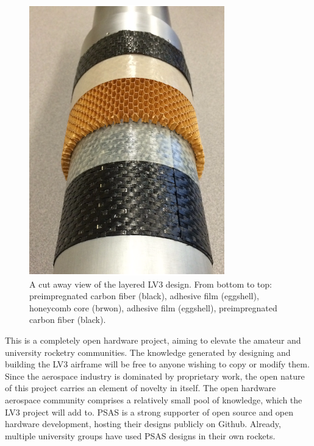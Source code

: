\documentclass{aiaa-tc}%
\begin{document}
\begin{figure}
\centering
\includegraphics[width=\linewidth]{img/layers.png}
\caption{A cut away view of the layered LV3 design. From bottom to top: preimpregnated carbon fiber (black), adhesive film (eggshell), honeycomb core (brwon), adhesive film (eggshell), preimpregnated carbon fiber (black).}
\label{fig:layers}
\end{figure}

This is a completely open hardware project, aiming to elevate the amateur and university rocketry communities. The knowledge generated by designing and building the LV3 airframe will be free to anyone wishing to copy or modify them. 
Since the aerospace industry is dominated by proprietary work, the open nature of this project carries an element of novelty in itself. The open hardware aerospace community comprises a relatively small pool of knowledge, which the LV3 project will add to. 
PSAS is a strong supporter of open source and open hardware development, hosting their designs publicly on Github. Already, multiple university groups have used PSAS designs in their own rockets. %
\end{document}
